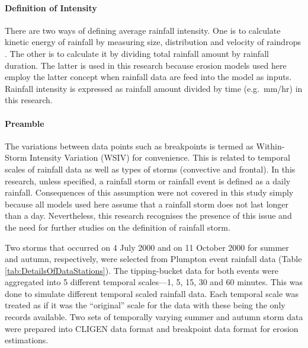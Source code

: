\paragraph{Definition of Intensity} There are two ways of defining average
rainfall intensity. One is to calculate kinetic energy of rainfall by measuring
size, distribution and velocity of raindrops \citep{vandijk2002-1}. The other is
to calculate it by dividing total rainfall amount by rainfall duration. The
latter is used in this research because erosion models used here employ the
latter concept when rainfall data are feed into the model as inputs. Rainfall
intensity is expressed as rainfall amount divided by time (e.g.\ mm/hr) in this
research.

\paragraph{Preamble} The variations between data points such as breakpoints is
termed as Within-Storm Intensity Variation (WSIV) for convenience. This is
related to temporal scales of rainfall data as well as types of storms
(convective and frontal). In this research, unless specified, a rainfall storm
or rainfall event is defined as a daily rainfall. Consequences of this
assumption were not covered in this study simply because all models used here
assume that a rainfall storm does not last longer than a day. Nevertheless, this
research recognises the presence of this issue and the need for further studies
on the definition of rainfall storm.

Two storms that occurred on 4 July 2000 and on 11 October 2000 for summer and
autumn, respectively, were selected from Plumpton event rainfall data (Table
\ref{tab:DetailsOfDataStations}).
The tipping-bucket data for both events were aggregated into 5 different
temporal scales---1, 5, 15, 30 and 60 minutes. This was done to simulate
different temporal scaled rainfall data. Each temporal scale was treated as if
it was the ``original'' scale for the data with these being the only records
available. Two sets of temporally varying summer and autumn storm data were
prepared into CLIGEN data format and breakpoint data format for erosion
estimations.

